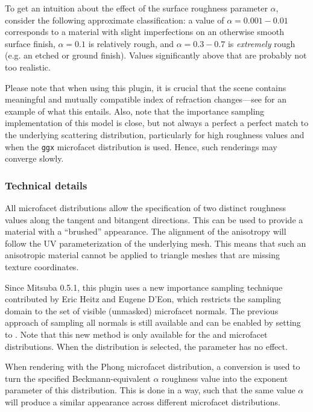 To get an intuition about the effect of the surface roughness parameter
$\alpha$, consider the following approximate classification: a value of
$\alpha=0.001-0.01$ corresponds to a material with slight imperfections
on an otherwise smooth surface finish, $\alpha=0.1$ is relatively rough,
and $\alpha=0.3-0.7$ is \emph{extremely} rough (e.g. an etched or ground
finish). Values significantly above that are probably not too realistic.

Please note that when using this plugin, it is crucial that the scene contains
meaningful and mutually compatible index of refraction changes---see
 for an example of what this entails. Also, note that
the importance sampling implementation of this model is close, but
not always a perfect a perfect match to the underlying scattering distribution,
particularly for high roughness values and when the \texttt{ggx}
microfacet distribution is used. Hence, such renderings may
converge slowly.

\subsubsection*{Technical details}
All microfacet distributions allow the specification of two distinct
roughness values along the tangent and bitangent directions. This can be
used to provide a material with a ``brushed'' appearance. The alignment
of the anisotropy will follow the UV parameterization of the underlying
mesh. This means that such an anisotropic material cannot be applied to
triangle meshes that are missing texture coordinates.

Since Mitsuba 0.5.1, this plugin uses a new importance sampling technique
contributed by Eric Heitz and Eugene D'Eon, which restricts the sampling
domain to the set of visible (unmasked) microfacet normals. The previous
approach of sampling all normals is still available and can be enabled
by setting  to .
Note that this new method is only available for the  and
 microfacet distributions. When the  distribution
is selected, the parameter has no effect.

When rendering with the Phong microfacet distribution, a conversion is
used to turn the specified Beckmann-equivalent $\alpha$ roughness value
into the exponent parameter of this distribution. This is done in a way,
such that the same value $\alpha$ will produce a similar appearance across
different microfacet distributions.

